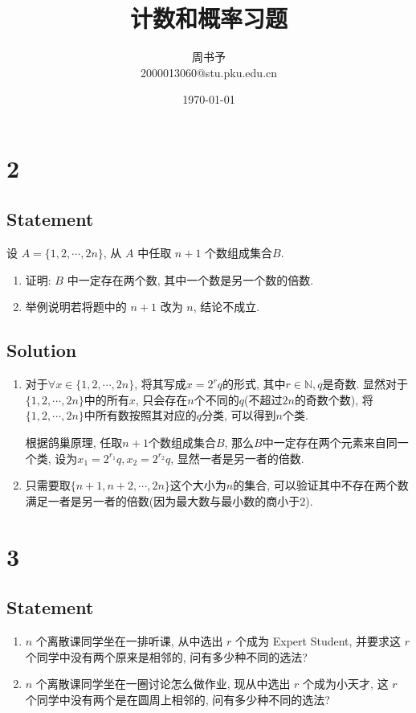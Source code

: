 \documentclass[UTF-8]{ctexart}
\title{\heiti\zihao{1} 计数和概率习题}
\author{\kaishu\zihao{-3} 周书予\\2000013060@stu.pku.edu.cn}
\date{\today}
\begin{document}
\maketitle

\section*{2}
\subsection*{Statement}
设 $A = \{1, 2, \cdots, 2n\}$, 从 $A$ 中任取 $n + 1$ 个数组成集合$B$.

\begin{enumerate}
	\item 证明: $B$ 中一定存在两个数, 其中一个数是另一个数的倍数.
	\item 举例说明若将题中的 $n + 1$ 改为 $n$, 结论不成立.
\end{enumerate}

\subsection*{Solution}

\begin{enumerate}
	\item 对于$\forall x \in \{1, 2, \cdots, 2n\}$, 将其写成$x = 2^rq$的形式, 其中$r \in \mathbb N, q$是奇数. 显然对于$\{1, 2, \cdots, 2n\}$中的所有$x$, 只会存在$n$个不同的$q$(不超过$2n$的奇数个数), 将$\{1, 2, \cdots, 2n\}$中所有数按照其对应的$q$分类, 可以得到$n$个类.
	
	根据鸽巢原理, 任取$n + 1$个数组成集合$B$, 那么$B$中一定存在两个元素来自同一个类, 设为$x_1 = 2^{r_1}q, x_2 = 2^{r_2}q$, 显然一者是另一者的倍数.
	\item 只需要取$\{n + 1, n + 2, \cdots, 2n\}$这个大小为$n$的集合, 可以验证其中不存在两个数满足一者是另一者的倍数(因为最大数与最小数的商小于$2$).
\end{enumerate}

\section*{3}
\subsection*{Statement}
\begin{enumerate}
\item $n$ 个离散课同学坐在一排听课, 从中选出 $r$ 个成为 Expert Student, 并要求这 $r$ 个同学中没有两个原来是相邻的, 问有多少种不同的选法?
\item $n$ 个离散课同学坐在一圈讨论怎么做作业, 现从中选出 $r$ 个成为小天才, 这 $r$ 个同学中没有两个是在圆周上相邻的, 问有多少种不同的选法?
\end{enumerate}
\end{document}
